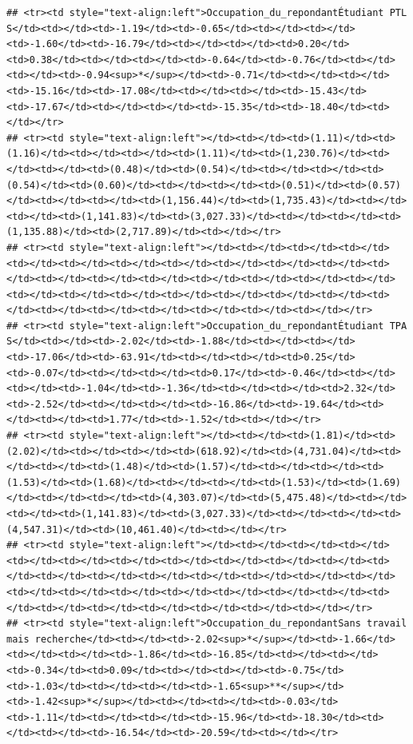 \documentclass[
]{article}
\begin{document}
\begin{verbatim}
## <tr><td style="text-align:left">Occupation_du_repondantÉtudiant PTL S</td><td></td><td>-1.19</td><td>-0.65</td><td></td><td></td><td>-1.60</td><td>-16.79</td><td></td><td></td><td>0.20</td><td>0.38</td><td></td><td></td><td>-0.64</td><td>-0.76</td><td></td><td></td><td>-0.94<sup>*</sup></td><td>-0.71</td><td></td><td></td><td>-15.16</td><td>-17.08</td><td></td><td></td><td>-15.43</td><td>-17.67</td><td></td><td></td><td>-15.35</td><td>-18.40</td><td></td></tr>
## <tr><td style="text-align:left"></td><td></td><td>(1.11)</td><td>(1.16)</td><td></td><td></td><td>(1.11)</td><td>(1,230.76)</td><td></td><td></td><td>(0.48)</td><td>(0.54)</td><td></td><td></td><td>(0.54)</td><td>(0.60)</td><td></td><td></td><td>(0.51)</td><td>(0.57)</td><td></td><td></td><td>(1,156.44)</td><td>(1,735.43)</td><td></td><td></td><td>(1,141.83)</td><td>(3,027.33)</td><td></td><td></td><td>(1,135.88)</td><td>(2,717.89)</td><td></td></tr>
## <tr><td style="text-align:left"></td><td></td><td></td><td></td><td></td><td></td><td></td><td></td><td></td><td></td><td></td><td></td><td></td><td></td><td></td><td></td><td></td><td></td><td></td><td></td><td></td><td></td><td></td><td></td><td></td><td></td><td></td><td></td><td></td><td></td><td></td><td></td><td></td></tr>
## <tr><td style="text-align:left">Occupation_du_repondantÉtudiant TPA S</td><td></td><td>-2.02</td><td>-1.88</td><td></td><td></td><td>-17.06</td><td>-63.91</td><td></td><td></td><td>0.25</td><td>-0.07</td><td></td><td></td><td>0.17</td><td>-0.46</td><td></td><td></td><td>-1.04</td><td>-1.36</td><td></td><td></td><td>2.32</td><td>-2.52</td><td></td><td></td><td>-16.86</td><td>-19.64</td><td></td><td></td><td>1.77</td><td>-1.52</td><td></td></tr>
## <tr><td style="text-align:left"></td><td></td><td>(1.81)</td><td>(2.02)</td><td></td><td></td><td>(618.92)</td><td>(4,731.04)</td><td></td><td></td><td>(1.48)</td><td>(1.57)</td><td></td><td></td><td>(1.53)</td><td>(1.68)</td><td></td><td></td><td>(1.53)</td><td>(1.69)</td><td></td><td></td><td>(4,303.07)</td><td>(5,475.48)</td><td></td><td></td><td>(1,141.83)</td><td>(3,027.33)</td><td></td><td></td><td>(4,547.31)</td><td>(10,461.40)</td><td></td></tr>
## <tr><td style="text-align:left"></td><td></td><td></td><td></td><td></td><td></td><td></td><td></td><td></td><td></td><td></td><td></td><td></td><td></td><td></td><td></td><td></td><td></td><td></td><td></td><td></td><td></td><td></td><td></td><td></td><td></td><td></td><td></td><td></td><td></td><td></td><td></td><td></td></tr>
## <tr><td style="text-align:left">Occupation_du_repondantSans travail mais recherche</td><td></td><td>-2.02<sup>*</sup></td><td>-1.66</td><td></td><td></td><td>-1.86</td><td>-16.85</td><td></td><td></td><td>-0.34</td><td>0.09</td><td></td><td></td><td>-0.75</td><td>-1.03</td><td></td><td></td><td>-1.65<sup>**</sup></td><td>-1.42<sup>*</sup></td><td></td><td></td><td>-0.03</td><td>-1.11</td><td></td><td></td><td>-15.96</td><td>-18.30</td><td></td><td></td><td>-16.54</td><td>-20.59</td><td></td></tr>

\end{verbatim}
\end{document}

